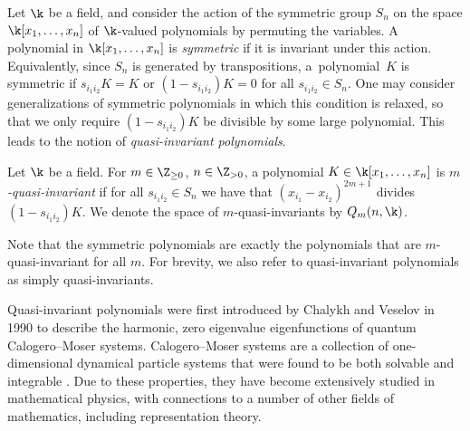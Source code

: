 
Let $\k$ be a field, and consider the action of the symmetric group $S_n$ on the space $\k[x_1,\dots,x_n]$ of $\k$-valued polynomials by permuting the variables. A polynomial in $\k[x_1,\dots,x_n]$ is \emph{symmetric} if it is invariant under this action. Equivalently, since $S_n$ is generated by transpositions, a~polynomial~$K$ is symmetric if $s_{i_1i_2}K=K$ or $(1-s_{i_1i_2})K=0$ for all $s_{i_1i_2}\in S_n$. One may consider generalizations of symmetric polynomials in which this condition is relaxed, so that we only require $(1-s_{i_1i_2})K$ be divisible by some large polynomial. This leads to the notion of \emph{quasi-invariant polynomials}.

\begin{Definition}
 Let $\k$ be a field. For $m\in\Z_{\geq 0}$, $n\in\Z_{>0}$, a polynomial $K\in\k[x_1,\dots,x_n]$ is \textit{$m$-quasi-invariant} if for all $s_{i_1i_2}\in S_n$ we have that $(x_{i_1}-x_{i_2})^{2m+1}$ divides $(1-s_{i_1i_2})K$. We denote the space of $m$-quasi-invariants by $Q_m(n,\k)$.
\end{Definition}

Note that the symmetric polynomials are exactly the polynomials that are $m$-quasi-invariant for all $m$. For brevity, we also refer to quasi-invariant polynomials as simply quasi-invariants.

Quasi-invariant polynomials were first introduced by Chalykh and Veselov in 1990 \cite{cmp/1104179957} to describe the harmonic, zero eigenvalue eigenfunctions of quantum Calogero--Moser systems. Calogero--Moser systems are a collection of one-dimensional dynamical particle systems that were found to be both solvable \cite{calogero} and integrable \cite{MOSER1975197}. Due to these properties, they have become extensively studied in mathematical physics, with connections to a number of other fields of mathematics, including representation theory.


